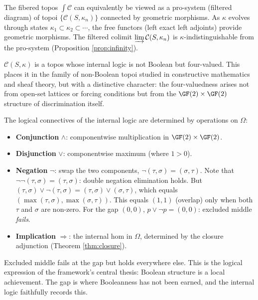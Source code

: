 \begin{corollary}
\label{cor:pro-topos}
The fibered topos $\int \mathcal{C}$ can equivalently be
viewed as a pro-system (filtered diagram) of topoi
$\{\mathcal{C}(S,\kappa_n)\}$ connected by geometric
morphisms. As $\kappa$ evolves through states
$\kappa_1 \subset \kappa_2 \subset \cdots$, the free
functors (left exact left adjoints) provide geometric
morphisms. The filtered colimit $\varinjlim
\mathcal{C}(S,\kappa_n)$ is $\kappa$-indistinguishable
from the pro-system (Proposition \ref{prop:infinity}).
\end{corollary}

\begin{remark}
$\mathcal{C}(S,\kappa)$ is a topos whose internal logic is
not Boolean but four-valued. This places it in the family
of non-Boolean topoi studied in constructive mathematics
and sheaf theory, but with a distinctive character: the
four-valuedness arises not from open-set lattices or
forcing conditions but from the $\GF(2) \times \GF(2)$
structure of discrimination itself.

The logical connectives of the internal logic are
determined by operations on $\Omega$:
\begin{itemize}[nosep]
  \item \textbf{Conjunction} $\wedge$: componentwise
    multiplication in $\GF(2) \times \GF(2)$.
  \item \textbf{Disjunction} $\vee$: componentwise
    maximum (where $1 > 0$).
  \item \textbf{Negation} $\neg$: swap the two components,
    $\neg(\tau,\sigma) = (\sigma, \tau)$. Note that
    $\neg\neg(\tau,\sigma) = (\tau,\sigma)$: double negation
    elimination holds. But $(\tau, \sigma) \vee
    \neg(\tau,\sigma) = (\tau,\sigma) \vee (\sigma,\tau)$,
    which equals $(\max(\tau,\sigma), \max(\sigma,\tau))$.
    This equals $(1,1)$ (overlap) only when both $\tau$
    and $\sigma$ are non-zero. For the gap $(0,0)$,
    $p \vee \neg p = (0,0)$: excluded middle \emph{fails}.
  \item \textbf{Implication} $\Rightarrow$: the internal
    hom in $\Omega$, determined by the closure adjunction
    (Theorem \ref{thm:closure}).
\end{itemize}
Excluded middle fails at the gap but holds everywhere
else. This is the logical expression of the framework's
central thesis: Boolean structure is a local achievement.
The gap is where Booleanness has not been earned, and the
internal logic faithfully records this.
\end{remark}

